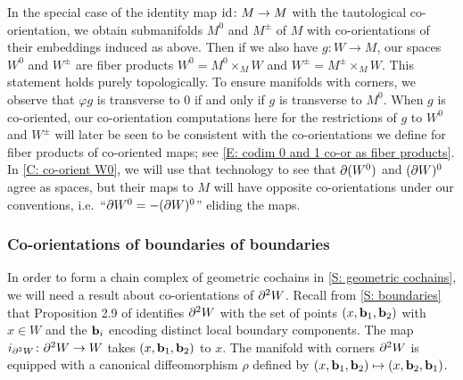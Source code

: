 \begin{example}
	In the special case of the identity map $\mathrm{id} \colon M \to M$ with the tautological co-orientation, we obtain submanifolds $M^0$ and $M^{\pm}$ of $M$ with co-orientations of their embeddings induced as above.
	Then if we also have $g \colon W \to M$, our spaces $W^0$ and $W^\pm$ are fiber products $W^0 = M^0 \times_M W$ and $W^{\pm} = M^{\pm} \times_M W$.
	This statement holds purely topologically.
	To ensure manifolds with corners, we observe that $\varphi g$ is transverse to $0$ if and only if $g$ is transverse to $M^0$.
	When $g$ is co-oriented, our co-orientation computations here for the restrictions of $g$ to $W^0$ and $W^\pm$ will later be seen to be consistent with the co-orientations we define for fiber products of co-oriented maps; see \cref{E: codim 0 and 1 co-or as fiber products}.
	In \cref{C: co-orient W0}, we will use that technology to see that $\partial (W^0)$ and $(\partial W)^0$ agree as spaces, but their maps to $M$ will have opposite co-orientations under our conventions, i.e.\ ``$\partial W^0 = -(\partial W)^0$'' eliding the maps.
\end{example}

\begin{comment}
	\red{TO DO SOMEWHERE: It will be convenient to show that $g \colon W^0 \to M$ with this co-orientation is the pullback of $M^0 \into M$ (co-oriented as defined here) and $g \colon W \to M$ and similarly for $g \colon W^\pm \to M$.
		Also need to rewrite things in other places as $M^0$, $M^\pm$, etc instead of always writing $\varphi^{-1}((\infty,0])$ etc.
		Also need to show that $\bd W^0 = -(\bd W)^0$, which should follow from the Leibniz rule and the first thing the previous sentence.}
\end{comment}

\subsubsection{Co-orientations of boundaries of boundaries}

In order to form a chain complex of geometric cochains in \cref{S: geometric cochains}, we will need a result about co-orientations of $\partial^2 W$.
Recall from \cref{S: boundaries} that Proposition 2.9 of \cite{Joy12} identifies $\partial^2 W$ with the set of points $(x,\mathbf{b}_1,\mathbf{b}_2)$ with $x \in W$ and the $\mathbf{b}_i$ encoding distinct local boundary components.
The map $i_{\partial^2 W} \colon \partial^2 W \to W$ takes $(x,\mathbf{b}_1,\mathbf{b}_2)$ to $x$.
The manifold with corners $\partial^2 W$ is equipped with a canonical diffeomorphism $\rho$ defined by $(x,\mathbf{b}_1,\mathbf{b}_2) \mapsto (x,\mathbf{b}_2,\mathbf{b}_1)$.

